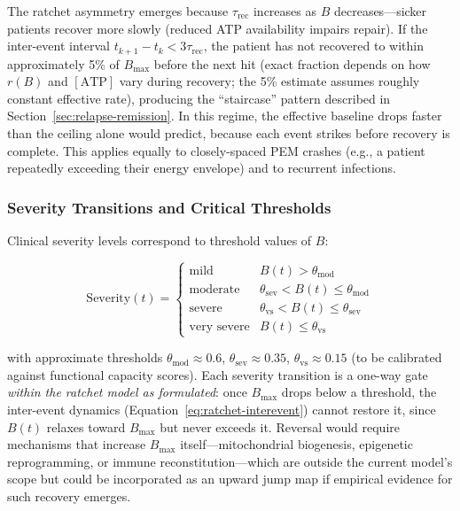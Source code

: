 The ratchet asymmetry emerges because $\tau_{\text{rec}}$ increases as $B$ decreases---sicker patients recover more slowly (reduced ATP availability impairs repair). If the inter-event interval $t_{k+1} - t_k < 3\tau_{\text{rec}}$, the patient has not recovered to within approximately 5\% of $B_{\max}$ before the next hit (exact fraction depends on how $r(B)$ and $[\text{ATP}]$ vary during recovery; the 5\% estimate assumes roughly constant effective rate), producing the ``staircase'' pattern described in Section~\ref{sec:relapse-remission}. In this regime, the effective baseline drops faster than the ceiling alone would predict, because each event strikes before recovery is complete. This applies equally to closely-spaced PEM crashes (e.g., a patient repeatedly exceeding their energy envelope) and to recurrent infections.

\subsubsection{Severity Transitions and Critical Thresholds}

Clinical severity levels correspond to threshold values of $B$:

\begin{equation}
\label{eq:ratchet-severity}
\text{Severity}(t) = \begin{cases}
\text{mild} & B(t) > \theta_{\text{mod}} \\
\text{moderate} & \theta_{\text{sev}} < B(t) \leq \theta_{\text{mod}} \\
\text{severe} & \theta_{\text{vs}} < B(t) \leq \theta_{\text{sev}} \\
\text{very severe} & B(t) \leq \theta_{\text{vs}}
\end{cases}
\end{equation}

with approximate thresholds $\theta_{\text{mod}} \approx 0.6$, $\theta_{\text{sev}} \approx 0.35$, $\theta_{\text{vs}} \approx 0.15$ (to be calibrated against functional capacity scores). Each severity transition is a one-way gate \emph{within the ratchet model as formulated}: once $B_{\max}$ drops below a threshold, the inter-event dynamics (Equation~\ref{eq:ratchet-interevent}) cannot restore it, since $B(t)$ relaxes toward $B_{\max}$ but never exceeds it. Reversal would require mechanisms that increase $B_{\max}$ itself---mitochondrial biogenesis, epigenetic reprogramming, or immune reconstitution---which are outside the current model's scope but could be incorporated as an upward jump map if empirical evidence for such recovery emerges.


